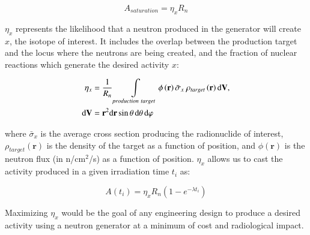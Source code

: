 \documentclass[5p]{elsarticle}
\newcommand{\pp}[1]{\left( #1\right)}
\begin{document}
\begin{equation}
A_{saturation} = \eta_x R_n
\end{equation}

$\eta_x$ represents the likelihood that a neutron produced in the generator will create $x$, the isotope of interest. 
It includes the overlap between the production target and the locus where the neutrons are being created, and the fraction of nuclear reactions which generate the desired activity $x$: 



\begin{align}
\eta_x &= \dfrac{1}{R_n} \int\displaylimits_{production\ target} \phi\pp{\mathbf{r}}\bar{\sigma}_x\ \rho_{target}\pp{\mathbf{r}}\text{d}\mathbf{V}, \nonumber\\
\text{d}\mathbf{V} &= \mathbf{r}^2 \text{d}\mathbf{r} \sin{\theta}\, \text{d}\theta\, \text{d}\varphi 
\end{align}


where $\bar{\sigma}_x$ is the average cross section producing the radionuclide of interest, $\rho_{target}\pp{\mathbf{r}}$ is the density of the target as a function of position, and $\phi\pp{\mathbf{r}}$ is the neutron flux (in n/cm$^2$/s) as a function of position.   $\eta_x$ allows us to cast the activity produced in a given irradiation time $t_i$ as:

\begin{equation}
A\pp{t_i} = \eta_x R_n \pp{1-e^{-\lambda t_i}}
\end{equation}


Maximizing $\eta_x$ would be the goal of any engineering design to produce a desired activity using a neutron generator at a minimum of cost and radiological impact. 
 
\end{document}
